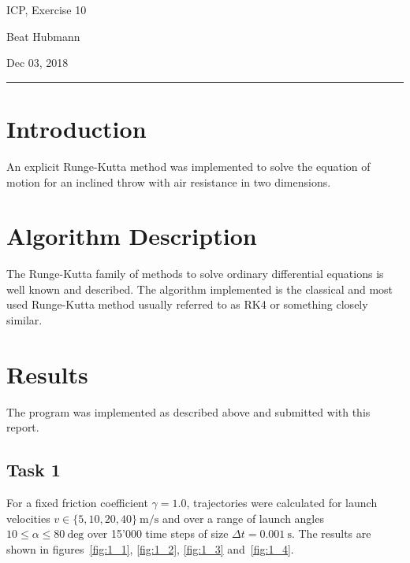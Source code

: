 \documentclass[11pt,a4paper]{article}
\begin{document}
\noindent\parbox{\linewidth}{
 \parbox{.25\linewidth}{ \large ICP, Exercise 10 }\hfill
 \parbox{.5\linewidth}{\begin{center} \large Beat Hubmann \end{center}}\hfill
 \parbox{.2\linewidth}{\begin{flushright} \large Dec 03, 2018 \end{flushright}}
}
\noindent\rule{\linewidth}{2pt}


\section{Introduction}

An explicit Runge-Kutta method was implemented to solve the equation of motion
for an inclined throw with air resistance in two dimensions.

\section{Algorithm Description}
The Runge-Kutta family of methods to solve ordinary differential equations is well known and described.
The algorithm implemented is the classical and most used Runge-Kutta method usually referred to as RK4 or
something closely similar.

\section{Results}

The program was implemented as described above and submitted with this report. 

\subsection{Task 1}
For a fixed friction coefficient $\gamma = 1.0$, trajectories were calculated for launch velocities $v \in \{5, 10, 20, 40\}\ \text{m/s}$ and 
over a range of launch angles $10 \le \alpha \le 80\ \text{deg}$ over 15'000 time steps of size
$\Delta t = 0.001\ \text{s}$. The results are shown in figures~\ref{fig:1_1}, \ref{fig:1_2},
\ref{fig:1_3} and~\ref{fig:1_4}.
\end{document}
